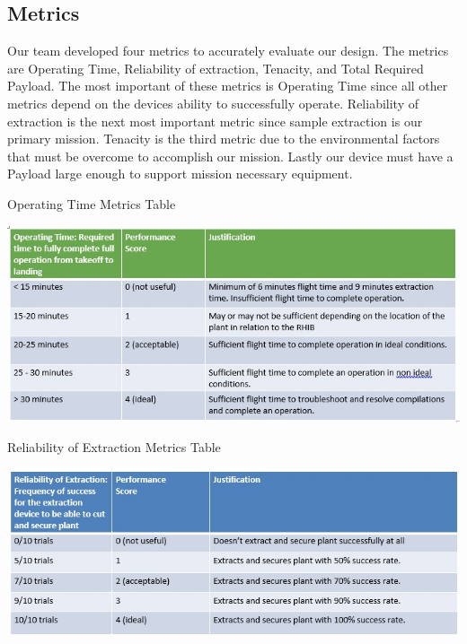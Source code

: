 \documentclass{wrcecapstone}
\begin{document}
\subsection{Metrics}
Our team developed four metrics to accurately evaluate our design. The metrics are Operating Time, Reliability of extraction, Tenacity, and Total Required Payload. The most important of these metrics is Operating Time since all other metrics depend on the devices ability to successfully operate. Reliability of extraction is the next most important metric since sample extraction is our primary mission.  Tenacity is the third metric due to the environmental factors that must be overcome to accomplish our mission. Lastly our device must have a Payload large enough to support mission necessary equipment.
\begin{table}
\caption{Operating Time Metrics Table}
\label{tab:2.5.1}
\begin{center}
\includegraphics[width=\columnwidth]{figures/table-251.jpg}
\end{center}
\end{table}
\begin{table}
\caption{Reliability of Extraction Metrics Table}
\label{tab:2.5.2}
\begin{center}
\includegraphics[width=\columnwidth]{figures/table-252.jpg}
\end{center}
\end{table}
\end{document}
